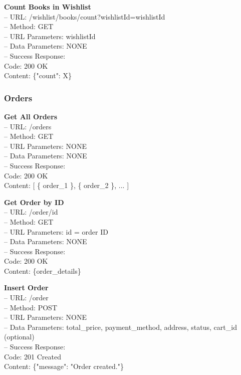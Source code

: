 \begin{flushleft} 
\textbf{Count Books in Wishlist} \\
– URL: /wishlist/books/count?wishlistId={wishlistId} \\
– Method: GET \\
– URL Parameters: wishlistId \\
– Data Parameters: NONE \\
– Success Response: \\
Code: 200 OK \\
Content: \{"count": X\}
\end{flushleft}

\subsubsection*{Orders}

\textbf{Get All Orders} \\
– URL: /orders \\
– Method: GET \\
– URL Parameters: NONE \\
– Data Parameters: NONE \\
– Success Response: \\
Code: 200 OK \\
Content: [ \{ order\_1 \}, \{ order\_2 \}, ... ]

\begin{flushleft} 
\textbf{Get Order by ID} \\
– URL: /order/{id} \\
– Method: GET \\
– URL Parameters: id = order ID \\
– Data Parameters: NONE \\
– Success Response: \\
Code: 200 OK \\
Content: \{order\_details\}
\end{flushleft}

\begin{flushleft} 
\textbf{Insert Order} \\
– URL: /order \\
– Method: POST \\
– URL Parameters: NONE \\
– Data Parameters: total\_price, payment\_method, address, status, cart\_id (optional) \\
– Success Response: \\
Code: 201 Created \\
Content: \{"message": "Order created."\}
\end{flushleft}

